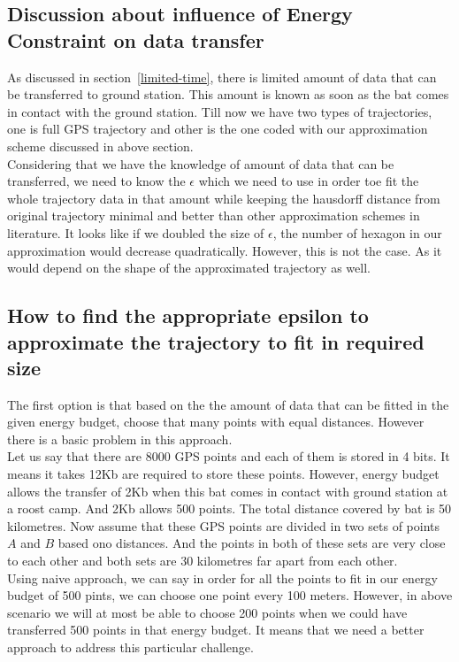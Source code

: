 \documentclass[conference]{IEEEtran}
\begin{document}
 \subsection{Discussion about influence of Energy Constraint on data transfer}
As discussed in section~\ref{limited-time}, there is limited amount of data that can be transferred to ground station. 
This amount is known as soon as the bat comes in contact with the ground station. Till now we have two types of 
trajectories, one is full GPS trajectory and other is the one coded with our approximation scheme discussed in above 
section.\\
Considering that we have the knowledge of amount of data that can be transferred, we need to know the $\epsilon$ 
which we need to use in order toe fit the whole trajectory data in that amount while keeping the hausdorff distance 
from original trajectory minimal and better than other approximation schemes in literature. It looks like if we doubled 
the size of $\epsilon$, the number of hexagon in our approximation would decrease quadratically. However, this is 
not the case. As it would depend on the shape of the approximated trajectory as well.  

\subsection{How to find the appropriate epsilon to approximate the trajectory to fit in required size}\label{sec:size-fitting}
The first option is that based on the the amount of data that can be fitted in the given energy budget, choose that many 
points with equal distances. However there is a basic problem in this approach.\\
Let us say that there are 8000 GPS points and each of them is stored in 4 bits. It means it takes 12Kb are required to store 
these points. However, energy budget allows the transfer of 2Kb when this bat comes in contact with ground station at a 
roost camp. And 2Kb allows 500 points. The total distance covered by bat is 50 kilometres. Now assume that these GPS 
points are divided in two sets of points $A$ and $B$ based ono distances. And the points in both of these sets are very 
close to each other and both sets are 30 kilometres far apart from each other. \\
Using naive approach, we can say in order for all the points to fit in our energy budget of 500 pints, we can choose one 
point every 100 meters. However, in above scenario we will at most be able to choose 200 points when we could have 
transferred 500 points in that energy budget. It means that we need a better approach to address this particular challenge.
\end{document}
